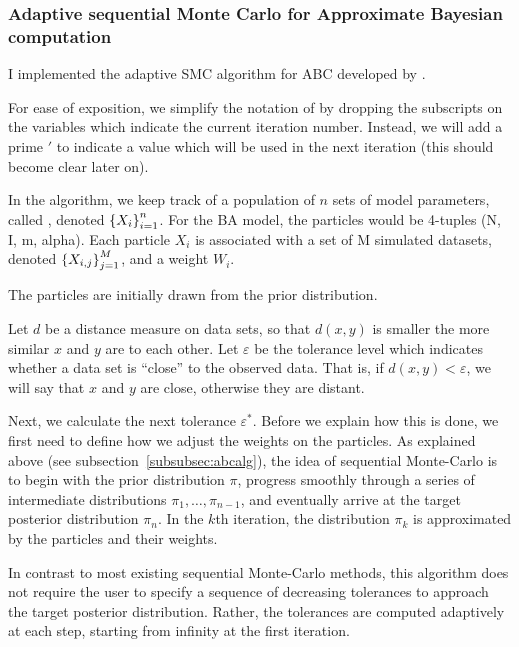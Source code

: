 \subsubsection*{Adaptive sequential Monte Carlo for Approximate Bayesian computation}

I implemented the adaptive \gls{SMC} algorithm for \gls{ABC} developed by
\textcite{del2012adaptive}. 

For ease of exposition, we simplify the notation of \textcite{del2012adaptive}
by dropping the subscripts on the variables which indicate the current
iteration number. Instead, we will add a prime $'$ to indicate a value which
will be used in the next iteration (this should become clear later on). 

In the algorithm, we keep track of a population of $n$ sets of model
parameters, called , denoted $\left\lbrace X_i\right\rbrace_{i=1}^{n}$. For the
\gls{BA} model, the particles would be 4-tuples (\gls{N}, \gls{I}, \gls{m},
\gls{alpha}). Each particle $X_i$ is associated with a set of \gls{M} simulated
datasets, denoted $\left\lbrace X_{i,j}\right\rbrace_{j=1}^M$, and a weight $W_i$. 

The particles are initially drawn from the prior distribution.

Let $d$ be a
distance measure on data sets, so that $d(x, y)$ is smaller the more similar
$x$ and $y$ are to each other. Let $\varepsilon$ be the tolerance level which
indicates whether a data set is ``close'' to the observed data. That is, if
$d(x, y) < \varepsilon$, we will say that $x$ and $y$ are close, otherwise they
are distant.


Next, we calculate the next tolerance $\varepsilon^*$. Before we explain how
this is done, we first need to define how we adjust the weights on the
particles. As explained above (see subsection~\ref{subsubsec:abcalg}), the idea
of sequential Monte-Carlo is to begin with the prior distribution $\pi$,
progress smoothly through a series of intermediate distributions $\pi_1,
\ldots, \pi_{n-1}$, and eventually arrive at the target posterior distribution
$\pi_n$. In the $k$th iteration, the distribution $\pi_k$ is approximated by
the particles and their weights. 

In contrast to most existing sequential Monte-Carlo methods, this
algorithm does not require the user to specify a sequence of decreasing
tolerances to approach the target posterior distribution. Rather, the
tolerances are computed adaptively at each step, starting from infinity at the
first iteration. 

